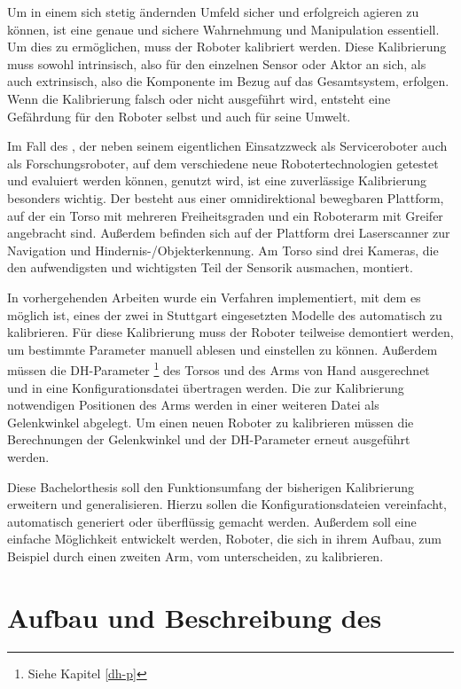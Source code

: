 Um in einem sich stetig ändernden Umfeld sicher und erfolgreich agieren zu 
können, ist eine genaue und sichere Wahrnehmung und Manipulation essentiell. 
Um dies zu ermöglichen, muss der Roboter kalibriert werden. Diese Kalibrierung 
muss sowohl intrinsisch, also für den einzelnen Sensor oder Aktor an sich, als 
auch extrinsisch, also die Komponente im Bezug auf das Gesamtsystem, erfolgen. 
Wenn die Kalibrierung falsch oder nicht ausgeführt wird, entsteht
eine Gefährdung für den Roboter selbst und auch für seine Umwelt. 

Im Fall des \cob, der neben seinem eigentlichen Einsatzzweck als Serviceroboter auch
als Forschungsroboter, auf dem verschiedene neue Robotertechnologien getestet 
und evaluiert werden können, genutzt wird, ist eine zuverlässige Kalibrierung 
besonders wichtig. Der \cob besteht aus einer omnidirektional bewegbaren 
Plattform, auf der ein Torso mit mehreren Freiheitsgraden und ein Roboterarm 
mit Greifer angebracht sind. Außerdem befinden sich auf der Plattform drei 
Laserscanner zur Navigation und Hindernis-/Objekterkennung. Am Torso sind drei 
Kameras, die den aufwendigsten und wichtigsten Teil der Sensorik ausmachen, 
montiert.

In vorhergehenden Arbeiten wurde ein Verfahren implementiert, mit dem es möglich 
ist, eines der zwei in Stuttgart eingesetzten Modelle des \cob automatisch zu 
kalibrieren. Für diese Kalibrierung muss der Roboter teilweise 
demontiert werden, um bestimmte Parameter manuell ablesen und einstellen zu 
können. Außerdem müssen die \ac{DH-Parameter} \footnote{Siehe Kapitel \ref{dh-p}} des Torsos und des Arms von Hand 
ausgerechnet und in eine Konfigurationsdatei übertragen werden. Die zur 
Kalibrierung notwendigen Positionen des Arms werden in einer weiteren Datei als 
Gelenkwinkel abgelegt. Um einen neuen Roboter zu kalibrieren müssen die 
Berechnungen der Gelenkwinkel und der \ac{DH-Parameter} erneut ausgeführt werden. 

Diese Bachelorthesis soll den Funktionsumfang der bisherigen Kalibrierung 
erweitern und generalisieren. Hierzu sollen die Konfigurationsdateien vereinfacht, 
automatisch generiert oder überflüssig gemacht werden. Außerdem soll eine 
einfache Möglichkeit entwickelt werden, Roboter, die sich in ihrem Aufbau, zum Beispiel durch 
einen zweiten Arm, vom \cob unterscheiden, zu kalibrieren.



\section{Aufbau und Beschreibung des \cob}

